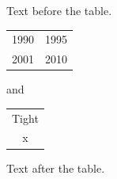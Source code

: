 \documentclass[11pt]{article}
\begin{document}
Text before the table.

\begin{tabular}{@{}l@{--}r@{}}1990 & 1995\\2001 & 2010\end{tabular} and \begin{tabular}{|@{}c@{}|}Tight\\x\end{tabular}

Text after the table.
\end{document}
